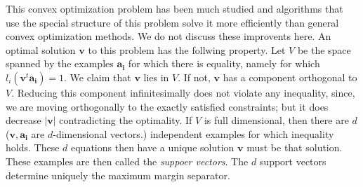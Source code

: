 This convex optimization problem has been much studied and algorithms that use the special structure of this problem solve it more efficiently than general convex optimization methods. We do not discuss these improvents here. An optimal solution \(\mathbf{v} \) to this problem has the follwing property. Let \(V\) be the space spanned by the examples \(\mathbf{a_i} \) for which there is equality, namely for which \(l_i \left( \mathbf{v} ^t \mathbf{a_i}  \right) = 1\). We claim that \(\mathbf{v} \) lies in \(V\).  If not, \(\mathbf{v} \) has a component orthogonal to \(V\). Reducing this component infinitesimally does not violate any inequality, since, we are moving orthogonally to the exactly satisfied constraints; but it does decrease \(\vert \mathbf{v}  \vert \) contradicting the optimality. If \(V\) is full dimensional, then there are \(d\) (\(\mathbf{v} , \mathbf{a_i} \) are \(d\)-dimensional vectors.) independent examples for which inequality holds. These \(d\) equations then have a unique solution \(\mathbf{v} \) must be that solution. These examples are then called the \textit{suppoer vectors}. The \(d\) support vectors determine uniquely the maximum margin separator.             

